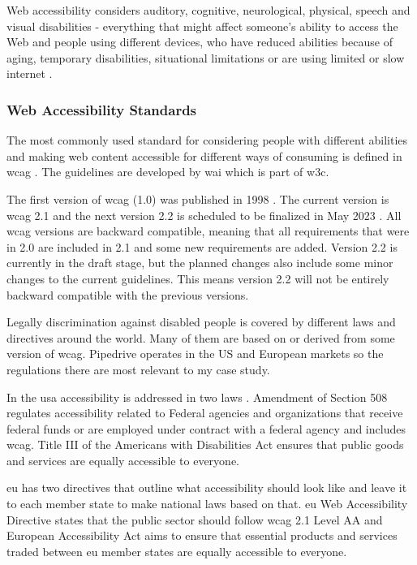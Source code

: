 \documentclass{master_thesis}
\begin{document}
Web accessibility considers auditory, cognitive, neurological, physical, speech and visual disabilities - everything that might affect someone's ability to access the Web and people using different devices, who have reduced abilities because of aging, temporary disabilities, situational limitations or are using limited or slow internet \citep{Henry2022}.

\subsubsection{Web Accessibility Standards}

The most commonly used standard for considering people with different abilities and making web content accessible for different ways of consuming is defined in \ac{wcag} \citep{Kirkpatrick2018}. The guidelines are developed by \ac{wai} which is part of \ac{w3c}.

The first version of \ac{wcag} (1.0) was published in 1998 \citep{Vanderheiden1998}. The current version is \ac{wcag} 2.1 and the next version 2.2 is scheduled to be finalized in May 2023 \citep{Henry2023}. All \ac{wcag} versions are backward compatible, meaning that all requirements that were in 2.0 are included in 2.1 and some new requirements are added. Version 2.2 is currently in the draft stage, but the planned changes also include some minor changes to the current guidelines. This means version 2.2 will not be entirely backward compatible with the previous versions.

Legally discrimination against disabled people is covered by different laws and directives around the world. Many of them are based on or derived from some version of \ac{wcag}. Pipedrive operates in the US and European markets so the regulations there are most relevant to my case study.

In the \ac{usa} accessibility is addressed in two laws \citep{Siteimprove}. Amendment of Section 508 regulates accessibility related to Federal agencies and organizations that receive federal funds or are employed under contract with a federal agency and includes \ac{wcag}. Title III of the Americans with Disabilities Act ensures that public goods and services are equally accessible to everyone.

\ac{eu} has two directives that outline what accessibility should look like and leave it to each member state to make national laws based on that. \ac{eu} Web Accessibility Directive states that the public sector should follow \ac{wcag} 2.1 Level AA and European Accessibility Act aims to ensure that essential products and services traded between \ac{eu} member states are equally accessible to everyone.
\end{document}
